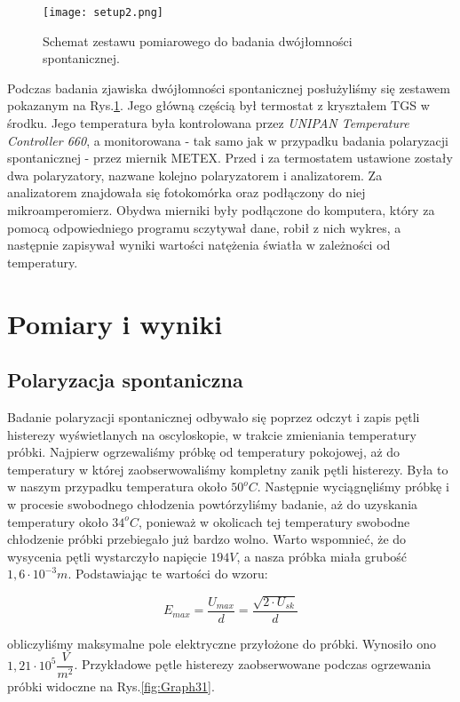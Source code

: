 \documentclass{article}
\begin{document}
\begin{figure}[!h]
	\centering
	\texttt{[image: setup2.png]}
	\caption{Schemat zestawu pomiarowego do badania dwójłomności spontanicznej.}
	\label{fig:setup2}
\end{figure}

Podczas badania zjawiska dwójłomności spontanicznej posłużyliśmy się zestawem pokazanym na Rys.\ref{fig:setup2}. Jego główną częścią był termostat z kryształem TGS w środku. Jego temperatura była kontrolowana przez \textit{UNIPAN Temperature Controller 660}, a monitorowana - tak samo jak w przypadku badania polaryzacji spontanicznej - przez miernik METEX. Przed i za termostatem ustawione zostały dwa polaryzatory, nazwane kolejno polaryzatorem i analizatorem. Za analizatorem znajdowała się fotokomórka oraz podłączony do niej mikroamperomierz. Obydwa mierniki były podłączone do komputera, który za pomocą odpowiedniego programu sczytywał dane, robił z nich wykres, a następnie zapisywał wyniki wartości natężenia światła w zależności od temperatury.

\section{Pomiary i wyniki}
\subsection{Polaryzacja spontaniczna}

Badanie polaryzacji spontanicznej odbywało się poprzez odczyt i zapis pętli histerezy wyświetlanych na oscyloskopie, w trakcie zmieniania temperatury próbki. Najpierw ogrzewaliśmy próbkę od temperatury pokojowej, aż do temperatury w której zaobserwowaliśmy kompletny zanik pętli histerezy. Była to w naszym przypadku temperatura około $50^{o}C$. Następnie wyciągnęliśmy próbkę i w procesie swobodnego chłodzenia powtórzyliśmy badanie, aż do uzyskania temperatury około $34^{o}C$, ponieważ w okolicach tej temperatury swobodne chłodzenie próbki przebiegało już bardzo wolno. Warto wspomnieć, że do wysycenia pętli wystarczyło napięcie $194V$, a nasza próbka miała grubość $1,6\cdot10^{-3}m$. Podstawiając te wartości do wzoru:

\begin{equation}
E_{max}=\dfrac{U_{max}}{d}=\dfrac{\sqrt{2 \cdot U_{sk}}}{d}
\end{equation}

obliczyliśmy maksymalne pole elektryczne przyłożone do próbki. Wynosiło ono $1,21\cdot 10^{5} \dfrac{V}{m^{2}}$. Przykładowe pętle histerezy zaobserwowane podczas ogrzewania próbki widoczne na Rys.\ref{fig:Graph31}.
\end{document}
